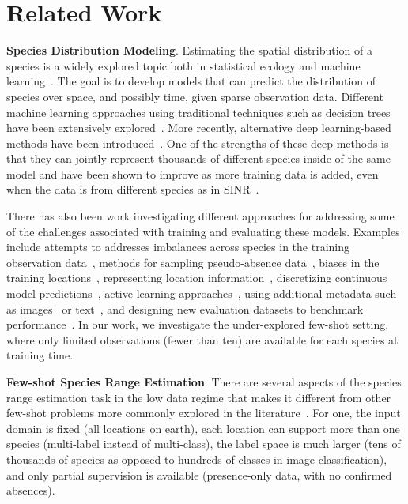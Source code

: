 \section{Related Work}
\vspace{-5pt}
{\bf Species Distribution Modeling}. 
Estimating the spatial distribution of a species is a widely explored topic both in statistical ecology and machine learning~\citep{beery2021species}. 
The goal is to develop models that can predict the  distribution of species over space, and possibly time, given sparse observation data. 
Different machine learning approaches using traditional techniques such as decision trees have been extensively explored~\citep{phillips2004maximum,elith2006novel}. 
More recently, alternative deep learning-based methods have been introduced~\citep{botella2018deep,mac2019presence,cole2023spatial,kellenberger2024performance}. 
One of the strengths of these deep methods is that they can jointly represent thousands of different species inside of the same model and have been shown to improve as more training data is added, even when the data is from different species as in SINR~\citep{cole2023spatial}. 

There has also been work investigating different approaches for addressing some of the challenges associated with training and evaluating these models.  
Examples include attempts to addresses imbalances across species in the training observation data~\citep{zbinden2024imbalance}, methods for sampling pseudo-absence data~\citep{zbinden2024selection}, biases in the training locations~\citep{chen2019bias}, representing location information~\citep{russwurm2023geographic}, discretizing continuous model predictions~\citep{binary_maps_cv4e_2024}, active learning approaches~\citep{lange2024active}, using additional metadata such as images~\citep{teng2023bird,dollinger2024sat,picek2024geoplant} or text~\citep{sastry2023ld,sastry2025taxabind,hamilton2024}, and designing new evaluation datasets to benchmark performance~\citep{cole2023spatial,picek2024geoplant}. 
In our work, we investigate the under-explored few-shot setting, where only limited observations (\eg fewer than ten) are available for each species at training time.

{\bf Few-shot Species Range Estimation}. 
There are several aspects of the species range estimation task in the low data regime that makes it different from other few-shot problems more commonly explored in the literature~\citep{parnami2022learning,wang2020generalizing}. 
For one, the input domain is fixed (\ie all locations on earth), each location can support more than one species (\ie multi-label instead of multi-class), the label space is much larger (\ie tens of thousands of species as opposed to hundreds of classes in image classification), and only partial supervision is available (\eg presence-only data, with no confirmed absences). 

